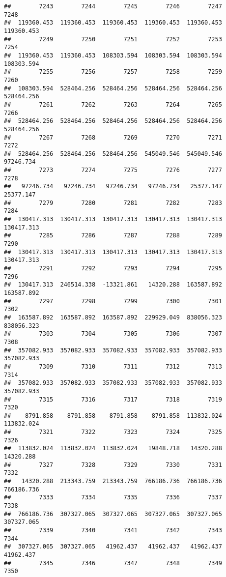 \documentclass[
]{book}
\begin{document}
\begin{verbatim}
##        7243        7244        7245        7246        7247        7248 
##  119360.453  119360.453  119360.453  119360.453  119360.453  119360.453 
##        7249        7250        7251        7252        7253        7254 
##  119360.453  119360.453  108303.594  108303.594  108303.594  108303.594 
##        7255        7256        7257        7258        7259        7260 
##  108303.594  528464.256  528464.256  528464.256  528464.256  528464.256 
##        7261        7262        7263        7264        7265        7266 
##  528464.256  528464.256  528464.256  528464.256  528464.256  528464.256 
##        7267        7268        7269        7270        7271        7272 
##  528464.256  528464.256  528464.256  545049.546  545049.546   97246.734 
##        7273        7274        7275        7276        7277        7278 
##   97246.734   97246.734   97246.734   97246.734   25377.147   25377.147 
##        7279        7280        7281        7282        7283        7284 
##  130417.313  130417.313  130417.313  130417.313  130417.313  130417.313 
##        7285        7286        7287        7288        7289        7290 
##  130417.313  130417.313  130417.313  130417.313  130417.313  130417.313 
##        7291        7292        7293        7294        7295        7296 
##  130417.313  246514.338  -13321.861   14320.288  163587.892  163587.892 
##        7297        7298        7299        7300        7301        7302 
##  163587.892  163587.892  163587.892  229929.049  838056.323  838056.323 
##        7303        7304        7305        7306        7307        7308 
##  357082.933  357082.933  357082.933  357082.933  357082.933  357082.933 
##        7309        7310        7311        7312        7313        7314 
##  357082.933  357082.933  357082.933  357082.933  357082.933  357082.933 
##        7315        7316        7317        7318        7319        7320 
##    8791.858    8791.858    8791.858    8791.858  113832.024  113832.024 
##        7321        7322        7323        7324        7325        7326 
##  113832.024  113832.024  113832.024   19848.718   14320.288   14320.288 
##        7327        7328        7329        7330        7331        7332 
##   14320.288  213343.759  213343.759  766186.736  766186.736  766186.736 
##        7333        7334        7335        7336        7337        7338 
##  766186.736  307327.065  307327.065  307327.065  307327.065  307327.065 
##        7339        7340        7341        7342        7343        7344 
##  307327.065  307327.065   41962.437   41962.437   41962.437   41962.437 
##        7345        7346        7347        7348        7349        7350 

\end{verbatim}
\end{document}
